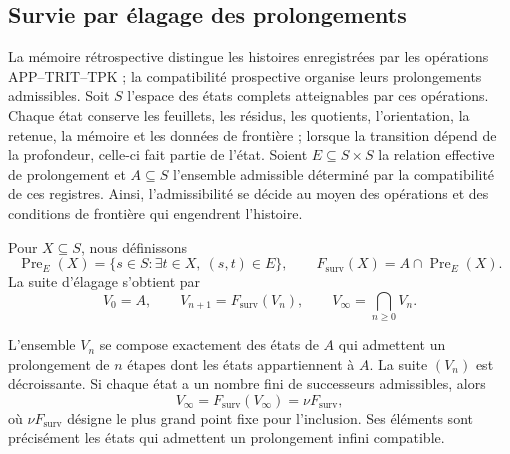\subsection{Survie par élagage des prolongements}
\label{hmtfg:base:corpus9:xi:supervivencia}

La mémoire rétrospective distingue les histoires enregistrées par les
opérations APP--TRIT--TPK ; la compatibilité prospective organise leurs
prolongements admissibles. Soit \(S\) l’espace des états complets
atteignables par ces opérations. Chaque état conserve les feuillets, les résidus,
les quotients, l’orientation, la retenue, la mémoire et les données de frontière ; lorsque la
transition dépend de la profondeur, celle-ci fait partie de l’état.
Soient \(E\subseteq S\times S\) la relation effective de prolongement et
\(A\subseteq S\) l’ensemble admissible déterminé par la compatibilité de
ces registres. Ainsi, l’admissibilité se décide au moyen des opérations et
des conditions de frontière qui engendrent l’histoire.

Pour \(X\subseteq S\), nous définissons
\begin{equation}
 \operatorname{Pre}_{E}(X)
 =\{s\in S:\exists t\in X,\ (s,t)\in E\},
 \qquad
 F_{\mathrm{surv}}(X)=A\cap\operatorname{Pre}_{E}(X).
 \label{hmtfg:base:corpus9:xi:operador-poda}
\end{equation}
La suite d’élagage s’obtient par
\begin{equation}
 V_0=A,\qquad
 V_{n+1}=F_{\mathrm{surv}}(V_n),\qquad
 V_\infty=\bigcap_{n\geq0}V_n.
 \label{hmtfg:base:corpus9:xi:sucesion-poda}
\end{equation}

\begin{proposition}
\label{hmtfg:base:corpus9:xi:mayor-punto-fijo}
L’ensemble \(V_n\) se compose exactement des états de \(A\) qui admettent
un prolongement de \(n\) étapes dont les états appartiennent à \(A\). La
suite \((V_n)\) est décroissante. Si chaque état a un nombre fini
de successeurs admissibles, alors
\[
 V_\infty=F_{\mathrm{surv}}(V_\infty)
          =\nu F_{\mathrm{surv}},
\]
où \(\nu F_{\mathrm{surv}}\) désigne le plus grand point fixe pour l’inclusion.
Ses éléments sont précisément les états qui admettent un prolongement
infini compatible.
\end{proposition}

